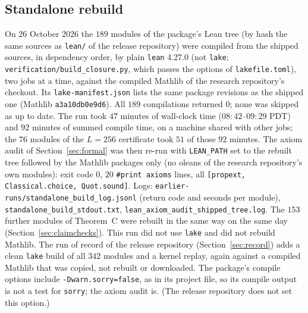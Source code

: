 \documentclass[11pt]{amsart}
\theoremstyle{remark}
\newcommand{\lean}[1]{\texttt{#1}}
\begin{document}
\subsection{Standalone rebuild}\label{sec:rebuild}
On 26 October 2026 the $189$ modules of the package's Lean tree (by hash the same sources as \texttt{lean/} of the release repository) were compiled from the shipped sources, in dependency order, by plain \texttt{lean} 4.27.0 (not \texttt{lake}; \texttt{verification/build\_closure.py}, which passes the options of \texttt{lakefile.toml}), two jobs at a time, against the compiled Mathlib of the research repository's checkout.
Its \texttt{lake-manifest.json} lists the same package revisions as the shipped one (Mathlib \texttt{a3a10db0e9d6}). All $189$ compilations returned $0$; none was skipped as up to date. The run took $47$ minutes of wall-clock time ($08{:}42$--$09{:}29$ PDT) and $92$ minutes of summed compile time, on a machine shared with other jobs; the $76$ modules of the $L=256$ certificate took $51$ of those $92$ minutes.
The axiom audit of Section~\ref{sec:formal} was then re-run with \texttt{LEAN\_PATH} set to the rebuilt tree followed by the Mathlib packages only (no oleans of the research repository's own modules): exit code $0$, $20$ \lean{\#print axioms} lines, all \lean{[propext, Classical.choice, Quot.sound]}.
Logs: \texttt{earlier-runs/standalone\_build\_log.jsonl} (return code and seconds per module), \texttt{standalone\_build\_stdout.txt}, \texttt{lean\_axiom\_audit\_shipped\_tree.log}.
The $153$ further modules of Theorem~C were rebuilt in the same way on the same day (Section~\ref{sec:claimchecks}).
This run did not use \texttt{lake} and did not rebuild Mathlib. The run of record of the release repository (Section~\ref{sec:record}) adds a clean \texttt{lake} build of all $342$ modules and a kernel replay, again against a compiled Mathlib that was copied, not rebuilt or downloaded. The package's compile options include \texttt{-Dwarn.sorry=false}, as in its project file, so its compile output is not a test for \texttt{sorry}; the axiom audit is. (The release repository does not set this option.)
\end{document}
